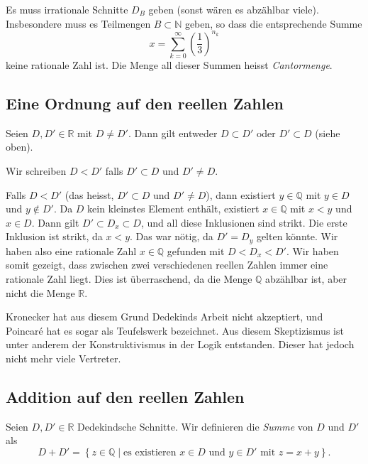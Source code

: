 \documentclass[../main.tex]{subfiles}
\begin{document}
Es muss irrationale Schnitte $D_{B}$ geben (sonst wären es abzählbar viele).
Insbesondere muss es Teilmengen $B \subset \mathbb N$ geben, so dass die
entsprechende Summe
\[x = \sum_{k=0}^{\infty} {\left(\frac{1}{3}\right)}^{n_{k}}\]
keine rationale Zahl ist.
Die Menge all dieser Summen heisst \emph{Cantormenge}.

\subsection*{Eine Ordnung auf den reellen Zahlen}
Seien $D, D' \in \mathbb R$ mit $D \neq D'$. Dann gilt entweder
$D \subset D'$ oder $D' \subset D$ (siehe oben).
\begin{definition}
  Wir schreiben $D < D'$ falls $D' \subset D$ und $D' \neq D$.
\end{definition}

\begin{remark}
  Falls $D < D'$ (das heisst, $D' \subset D$ und $D' \neq D$), dann
  existiert $y \in \mathbb Q$ mit $y \in D$ und $y \notin D'$.
  Da $D$ kein kleinstes Element enthält,
  existiert $x \in \mathbb Q$ mit $x < y$ und $x \in D$.
  Dann gilt $D' \subset D_{x} \subset D$, und all diese
  Inklusionen sind strikt. Die erste Inklusion ist strikt,
  da $x < y$. Das war nötig, da $D' = D_{y}$
  gelten könnte. Wir haben also eine rationale Zahl
  $x \in \mathbb Q$ gefunden mit
  $D < D_{x} < D'$.
  Wir haben somit gezeigt, dass zwischen zwei verschiedenen reellen
  Zahlen immer eine rationale Zahl liegt.
  Dies ist überraschend, da die Menge $\mathbb Q$
  abzählbar ist, aber nicht die Menge $\mathbb R$.

  Kronecker hat aus diesem Grund Dedekinds Arbeit nicht akzeptiert,
  und Poincaré hat es sogar als Teufelswerk bezeichnet.
  Aus diesem Skeptizismus ist unter anderem der
  Konstruktivismus in der Logik entstanden.
  Dieser hat jedoch nicht mehr viele Vertreter.
\end{remark}

\subsection*{Addition auf den reellen Zahlen}

\begin{definition}
Seien $D, D' \in \mathbb R$ Dedekindsche Schnitte.
Wir definieren die \emph{Summe} von $D$ und $D'$ als
\[D + D' = \left\{z \in \mathbb Q \mid \text{es existieren }
    x \in D \text{ und } y \in D' \text{ mit } z = x + y\right\}.\]
\end{definition}
\end{document}
